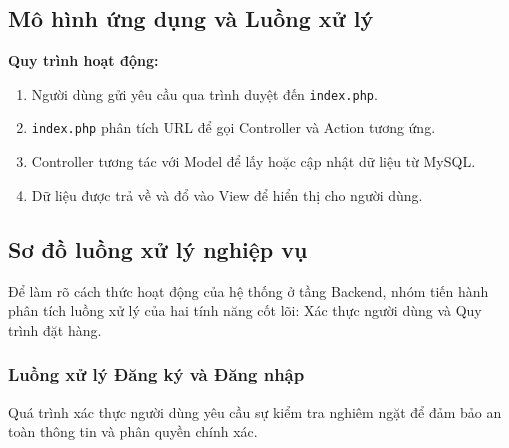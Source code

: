\subsection{Mô hình ứng dụng và Luồng xử lý}


\textbf{Quy trình hoạt động:}
\begin{enumerate}
    \item Người dùng gửi yêu cầu qua trình duyệt đến \texttt{index.php}.
    \item \texttt{index.php} phân tích URL để gọi Controller và Action tương ứng.
    \item Controller tương tác với Model để lấy hoặc cập nhật dữ liệu từ MySQL.
    \item Dữ liệu được trả về và đổ vào View để hiển thị cho người dùng.
\end{enumerate}

\subsection{Sơ đồ luồng xử lý nghiệp vụ}

Để làm rõ cách thức hoạt động của hệ thống ở tầng Backend, nhóm tiến hành phân tích luồng xử lý của hai tính năng cốt lõi: Xác thực người dùng và Quy trình đặt hàng.

\subsubsection{Luồng xử lý Đăng ký và Đăng nhập}
Quá trình xác thực người dùng yêu cầu sự kiểm tra nghiêm ngặt để đảm bảo an toàn thông tin và phân quyền chính xác.

